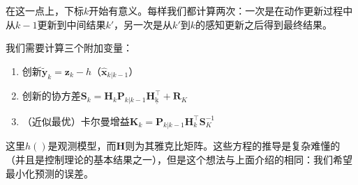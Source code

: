 
在这一点上，下标$k$开始有意义。每样我们都计算两次：一次是在动作更新过程中从$k-1$更新到中间结果$k'$，另一次是从$k'$到$k$的感知更新之后得到最终结果。


我们需要计算三个附加变量：

\begin{enumerate}

\item 创新$\tilde{\boldsymbol{y}}_{k}=\boldsymbol{z}_{k}-h（\hat{\boldsymbol{x}}_{k|k-1}）$
\item 创新的协方差$\boldsymbol{S}_{k}={\boldsymbol{H}_{k}}\boldsymbol{P}_{k|k-1}{\boldsymbol{H}_{ķ}^\top}+\boldsymbol{R}_{K}$
\item （近似最优）卡尔曼增益$\boldsymbol{K}_{k}=\boldsymbol{P}_{k|k-1}{\boldsymbol{H}_{k}^\top}\boldsymbol{S}_{K}^{-1}$
\end{enumerate}


这里$h()$是观测模型，而$\boldsymbol{H}$则为其雅克比矩阵。这些方程的推导是复杂难懂的（并且是控制理论的基本结果之一），但是这个想法与上面介绍的相同：我们希望最小化预测的误差。


